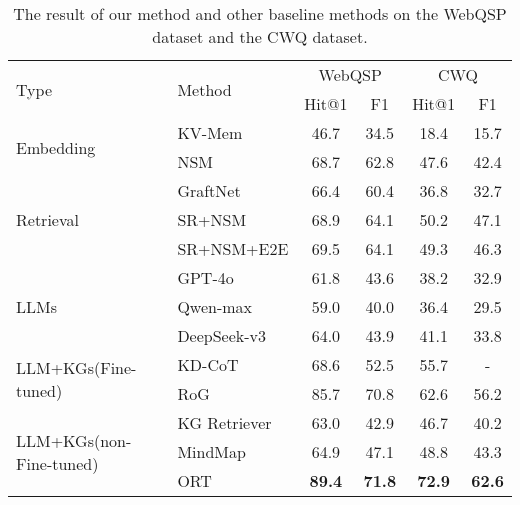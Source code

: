 \begin{table*}[t]
  \centering
  \normalsize
  \caption{The result of our method and other baseline methods on the WebQSP dataset and the CWQ dataset.}
  \label{table:baseline}
  \renewcommand{\arraystretch}{1.2} %
  \setlength{\tabcolsep}{6pt} %
  \begin{tabular}{l p{5cm} c c c c}
    \toprule
    \multirow{2}{*}{Type} & \multirow{2}{*}{Method} & \multicolumn{2}{c}{WebQSP} & \multicolumn{2}{c}{CWQ} \\
    \cmidrule(lr){3-4} \cmidrule(lr){5-6}
                          &                                          & Hit@1  & F1     & Hit@1 & F1 \\
    \midrule
    \multirow{2}{*}{Embedding} 
                          & KV-Mem \cite{Miller2016KeyValueMN}           & 46.7   & 34.5   & 18.4  & 15.7 \\
                          & NSM \cite{He2021ImprovingMK}                 & 68.7   & 62.8   & 47.6  & 42.4 \\
    \midrule
    \multirow{3}{*}{Retrieval} 
                          & GraftNet \cite{Sun2018OpenDQ}                & 66.4   & 60.4   & 36.8  & 32.7 \\
                          & SR+NSM \cite{Zhang2022SubgraphRE}            & 68.9   & 64.1   & 50.2  & 47.1 \\
                          & SR+NSM+E2E \cite{Zhang2022SubgraphRE}        & 69.5   & 64.1   & 49.3  & 46.3 \\
    \midrule
    \multirow{3}{*}{LLMs} 
                          & GPT-4o                  & 61.8   & 43.6   & 38.2  & 32.9 \\
                          & Qwen-max                & 59.0   & 40.0   & 36.4  & 29.5 \\
                          & DeepSeek-v3 \cite{DeepSeekAI2024DeepSeekV3TR}             & 64.0   & 43.9   & 41.1  & 33.8 \\
    \midrule
    \multirow{2}{*}{LLM+KGs(Fine-tuned)} 
                          & KD-CoT \cite{Wang2023KnowledgeDrivenCE}                 
                          & 68.6   & 52.5   & 55.7  & -    \\
                          & RoG \cite{Luo2023ReasoningOG}                    
                          & 85.7   & 70.8   & 62.6  & 56.2 \\
    \midrule
    \multirow{3}{*}{LLM+KGs(non-Fine-tuned)} 
                          & KG Retriever            
                          & 63.0   & 42.9   & 46.7  & 40.2 \\
                          & MindMap \cite{wen-etal-2024-mindmap}        
                          & 64.9   & 47.1   & 48.8  & 43.3\\
                          \cmidrule(lr){2-6} %
                          & ORT             & \textbf{89.4} & \textbf{71.8} & \textbf{72.9} & \textbf{62.6} \\
    \bottomrule
  \end{tabular}
\end{table*}